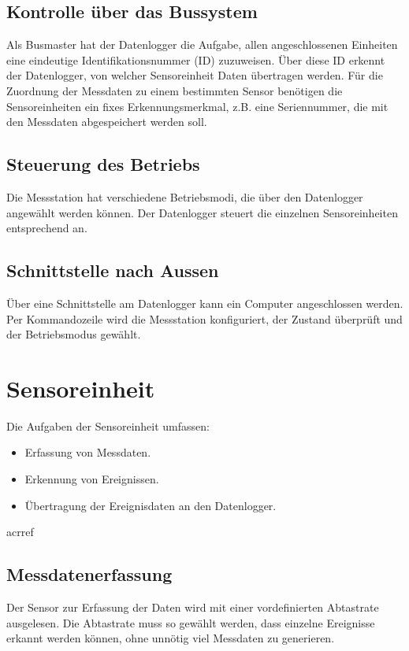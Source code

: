 \subsection{Kontrolle über das Bussystem}
Als Busmaster hat der Datenlogger die Aufgabe, allen angeschlossenen Einheiten eine eindeutige Identifikationsnummer (ID) zuzuweisen. Über diese ID erkennt der Datenlogger, von welcher Sensoreinheit Daten übertragen werden. Für die Zuordnung der Messdaten zu einem bestimmten Sensor benötigen die Sensoreinheiten ein fixes Erkennungsmerkmal, z.B. eine Seriennummer, die mit den Messdaten abgespeichert werden soll.


\subsection{Steuerung des Betriebs}
Die Messstation hat verschiedene Betriebsmodi, die über den Datenlogger angewählt werden können. Der Datenlogger steuert die einzelnen Sensoreinheiten entsprechend an.


\subsection{Schnittstelle nach Aussen}
Über eine Schnittstelle am Datenlogger kann ein Computer angeschlossen werden. Per Kommandozeile wird die Messstation konfiguriert, der Zustand überprüft und der Betriebsmodus gewählt.


\section{Sensoreinheit}
Die Aufgaben der Sensoreinheit umfassen:
\begin{itemize}
\item Erfassung von Messdaten.
\item Erkennung von Ereignissen.
\item Übertragung der Ereignisdaten an den Datenlogger.
\end{itemize}

\gls{acrref}
\subsection{Messdatenerfassung}
Der Sensor zur Erfassung der Daten wird mit einer vordefinierten Abtastrate ausgelesen. Die Abtastrate muss so gewählt werden, dass einzelne Ereignisse erkannt werden können, ohne unnötig viel Messdaten zu generieren.

